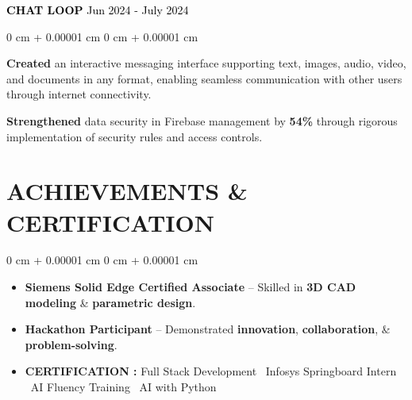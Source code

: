 \documentclass[10pt, letterpaper]{article}
\newenvironment{highlightsforbulletentries}{    \begin{itemize}[        topsep=0.10 cm,        parsep=0.10 cm,        partopsep=0pt,        itemsep=0pt,        leftmargin=10pt    ]}{    \end{itemize}} %
\newenvironment{onecolentry}{    \begin{adjustwidth}{        0 cm + 0.00001 cm    }{        0 cm + 0.00001 cm    }}{    \end{adjustwidth}} %
\newenvironment{header}{    \setlength{\topsep}{0pt}\par\kern\topsep\centering\linespread{1.5}}{    \par\kern\topsep} %
\begin{document}
\begin{header}
\vspace{0.5 cm}       \noindent\textbf{\textcolor{black}{CHAT LOOP}} \href{https://yourlivelink.com}{\textbf{\textcolor{black}{}}}  \hfill \textcolor{black}{Jun 2024 - July 2024} \\\vspace{0.10 cm}
\vspace{0.10 cm}
\begin{onecolentry}    \begin{highlights}        \item \textbf{Created} an interactive messaging interface supporting text, images, audio, video, and documents in any format, enabling seamless communication with other users through internet connectivity.        \item \textbf{Strengthened} data security in Firebase management by \textbf{54\%} through rigorous implementation of security rules and access controls.           \end{highlights}\end{onecolentry}
\vspace{0.10 cm}

\section{ACHIEVEMENTS \& CERTIFICATION}
\vspace{0.10 cm}
\begin{onecolentry}    \begin{highlightsforbulletentries}
    \item \textbf{Siemens Solid Edge Certified Associate} – Skilled in \textbf{3D CAD modeling} \& \textbf{parametric design}.        \item \textbf{Hackathon Participant} – Demonstrated \textbf{innovation}, \textbf{collaboration}, \& \textbf{problem-solving}.       \item \textbf{CERTIFICATION :}  Full Stack Development \textbar\ Infosys Springboard Intern \textbar\ AI Fluency Training \textbar\ AI with Python
        \end{highlightsforbulletentries}\end{onecolentry}
\end{document}
